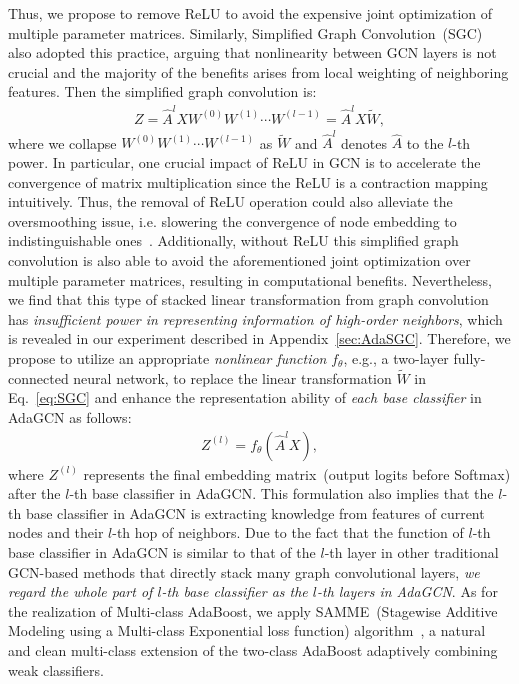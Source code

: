 \documentclass{article} \usepackage{iclr2021_conference,times}
\begin{document}
Thus, we propose to remove ReLU to avoid the expensive joint optimization of multiple parameter matrices. Similarly, Simplified Graph Convolution~(SGC)~\citep{wu2019simplifying} also adopted this practice, arguing that nonlinearity between GCN layers is not crucial and the majority of the benefits arises from local weighting of neighboring features. Then the simplified graph convolution is:
\begin{equation} \begin{aligned} \label{eq:SGC}
Z=\hat{A}^l X W^{(0)} W^{(1)} \cdots W^{(l-1)} = \hat{A}^lX \tilde{W},
\end{aligned} \end{equation}
where we collapse $W^{(0)} W^{(1)} \cdots W^{(l-1)}$ as $\tilde{W}$ and $\hat{A}^l$ denotes $\hat{A}$ to the $l$-th power. In particular, one crucial impact of ReLU in GCN is to accelerate the convergence of matrix multiplication since the ReLU is a contraction mapping intuitively. Thus, the removal of ReLU operation could also alleviate the oversmoothing issue, i.e. slowering the convergence of node embedding to indistinguishable ones~\citep{li2018deeper}. Additionally, without ReLU this simplified graph convolution is also able to avoid the aforementioned joint optimization over multiple parameter matrices, resulting in computational benefits. Nevertheless, we find that this type of stacked linear transformation from graph convolution has \textit{insufficient power in representing information of high-order neighbors}, which is revealed in our experiment described in Appendix~\ref{sec:AdaSGC}. Therefore, we propose to utilize an appropriate \textit{nonlinear function} $f_\theta$, e.g., a two-layer fully-connected neural network, to replace the linear transformation $\tilde{W}$ in Eq.~\ref{eq:SGC} and enhance the representation ability of \textit{each base classifier} in AdaGCN as follows:
\begin{equation} 
\begin{aligned} 
Z^{(l)}=f_{\theta}(\hat{A}^l X),
\end{aligned} 
\end{equation}
where $Z^{(l)}$ represents the final embedding matrix~(output logits before Softmax) after the $l$-th base classifier in AdaGCN. This formulation also implies that the $l$-th base classifier in AdaGCN is extracting knowledge from features of current nodes and their $l$-th hop of neighbors. Due to the fact that the function of $l$-th base classifier in AdaGCN is similar to that of the $l$-th layer in other traditional GCN-based methods that directly stack many graph convolutional layers, \emph{we regard the whole part of $l$-th base classifier as the $l$-th layers in AdaGCN}. As for the realization of Multi-class AdaBoost, we apply SAMME~(Stagewise Additive Modeling using a Multi-class Exponential loss function) algorithm~\citep{hastie2009multi}, a natural and clean multi-class extension of the two-class AdaBoost  adaptively combining weak classifiers. 
\end{document}
